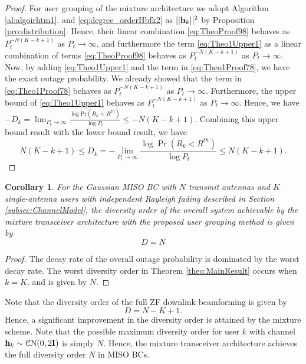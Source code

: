 \documentclass[11pt, draft, onecolumn ]{IEEEtran}
\newtheorem{corollary}{Corollary}
\begin{document}
\begin{proof} {}{For user grouping of the mixture architecture we adopt Algorithm \ref{al:algoirhtm1}.}
and \eqref{eq:degree_orderHbfk2}  as  $||{\bf h}_k||^2$ by Proposition \ref{pro:distribution}.  Hence, their linear combination \eqref{eq:TheoProof98} behaves as $P_t^{-N(K-k+1)}$ as $P_t\rightarrow \infty$, and furthermore the term \eqref{eq:Theo1Upper1} as a linear combination of terms  \eqref{eq:TheoProof98}   behaves as $P_t^{-N(K-k+1)}$ as $P_t\rightarrow \infty$.  Now, by adding \eqref{eq:Theo1Upper1} and the term in  \eqref{eq:Theo1Proof78}, we have the exact outage probability.
 We already showed that the term in  \eqref{eq:Theo1Proof78} behaves as $P_t^{-N(K-k+1)}$ as $P_t\rightarrow \infty$. Furthermore, the upper bound of \eqref{eq:Theo1Upper1} behaves as $P_t^{-N(K-k+1)}$ as $P_t\rightarrow \infty$. Hence, we have
 $-D_k  =\lim_{P_t \rightarrow \infty} \frac{ \log \mathrm{Pr}(R_k < R^{th})}{\log P_t} \le -N(K-k+1)$.
  Combining this upper bound result with the lower bound result, we have
\begin{equation}
             N (K - k + 1)    \leq   D_k= - \lim_{P_t \rightarrow \infty} \frac{\log \Pr(R_k < R^{th})}{\log P_t} \leq N (K - k + 1).
\end{equation}
\end{proof}




\begin{corollary}  \label{cor:systemDorder}
For the Gaussian MISO BC with $N$ transmit antennas and $K$ single-antenna users with independent Rayleigh fading described in Section \ref{subsec:ChannelModel},  the diversity order of the overall system  achievable by  the {}{mixture transceiver architecture with the proposed user grouping method} is given by
\begin{equation}
   D = N
\end{equation}
\end{corollary}
\begin{proof}
The decay rate of the overall outage probability is dominated by the worst decay rate.   The worst diversity order in Theorem  \ref{theo:MainResult} occurs  when $k=K$, and is given by $N$.
\end{proof}
Note that
the diversity order of the full ZF downlink beamforming is given by \cite{Chen&Ding&Dai:16Access}
\begin{equation}  \label{eq:diversityOrderZF}
D=N-K+1.
\end{equation}
Hence, a significant improvement in the diversity order is attained by the mixture scheme.
{}{Note that the possible maximum diversity order for user $k$ with channel ${\bf h}_k \sim {\cal C}{\cal N}(0,2{\bf I})$ is simply $N$.} Hence,
the mixture transceiver architecture  achieves the full diversity order $N$ in MISO BCs.
\end{document}

